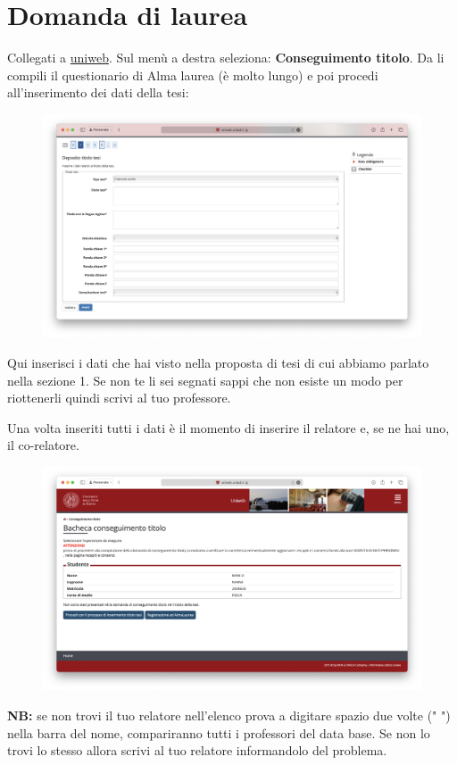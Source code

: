 \documentclass[12pt]{article}
\begin{document}
\newpage
\section{Domanda di laurea}
Collegati a \href{https://uniweb.unipd.it/Root.do}{uniweb}. Sul menù a destra seleziona: \textbf{Conseguimento titolo}. Da li compili il questionario di Alma laurea (è molto lungo) e poi procedi all'inserimento dei dati della tesi:
\begin{figure}[H]
    \centering
  \includegraphics[width=1\textwidth]{images/datitesi}
\end{figure}
Qui inserisci i dati che hai visto nella proposta di tesi di cui abbiamo parlato nella sezione 1. Se non te li sei segnati sappi che non esiste un modo per riottenerli quindi scrivi al tuo professore.

\newpage
Una volta inseriti tutti i dati è il momento di inserire il relatore e, se ne hai uno, il co-relatore.
\begin{figure}[H]
    \centering
  \includegraphics[width=1\textwidth]{images/Datirelatore}
\end{figure}
\textbf{NB:} se non trovi il tuo relatore nell'elenco prova a digitare spazio due volte ("  ") nella barra del nome, compariranno tutti i professori del data base. Se non lo trovi lo stesso allora scrivi al tuo relatore informandolo del problema. 
\end{document}
